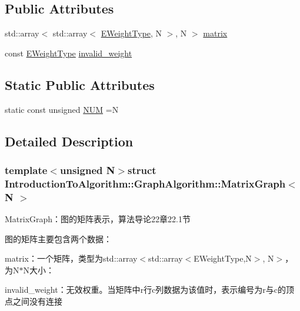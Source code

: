 \subsection*{Public Attributes}
\begin{DoxyCompactItemize}
\item 
std\+::array$<$ std\+::array$<$ \hyperlink{struct_introduction_to_algorithm_1_1_graph_algorithm_1_1_matrix_graph_af54dbf6d171b89b81b490de13f1fb02f}{E\+Weight\+Type}, N $>$, N $>$ \hyperlink{struct_introduction_to_algorithm_1_1_graph_algorithm_1_1_matrix_graph_ae1febbc0e4a86c325a16a942947a03bf}{matrix}
\item 
const \hyperlink{struct_introduction_to_algorithm_1_1_graph_algorithm_1_1_matrix_graph_af54dbf6d171b89b81b490de13f1fb02f}{E\+Weight\+Type} \hyperlink{struct_introduction_to_algorithm_1_1_graph_algorithm_1_1_matrix_graph_accc79376e509d7ffa016ef5003512976}{invalid\+\_\+weight}
\end{DoxyCompactItemize}
\subsection*{Static Public Attributes}
\begin{DoxyCompactItemize}
\item 
static const unsigned \hyperlink{struct_introduction_to_algorithm_1_1_graph_algorithm_1_1_matrix_graph_a68d153cb2714464d5c432d667e29f28f}{N\+U\+M} =N
\end{DoxyCompactItemize}


\subsection{Detailed Description}
\subsubsection*{template$<$unsigned N$>$struct Introduction\+To\+Algorithm\+::\+Graph\+Algorithm\+::\+Matrix\+Graph$<$ N $>$}

Matrix\+Graph：图的矩阵表示，算法导论22章22.1节 

图的矩阵主要包含两个数据：


\begin{DoxyItemize}
\item {\ttfamily matrix}：一个矩阵，类型为{\ttfamily std\+::array$<$std\+::array$<$E\+Weight\+Type,N$>$, N$>$}，为{\ttfamily N$\ast$\+N}大小：
\item {\ttfamily invalid\+\_\+weight}：无效权重。当矩阵中{\ttfamily r}行{\ttfamily c}列数据为该值时，表示编号为{\ttfamily r}与{\ttfamily c}的顶点之间没有连接
\end{DoxyItemize}

